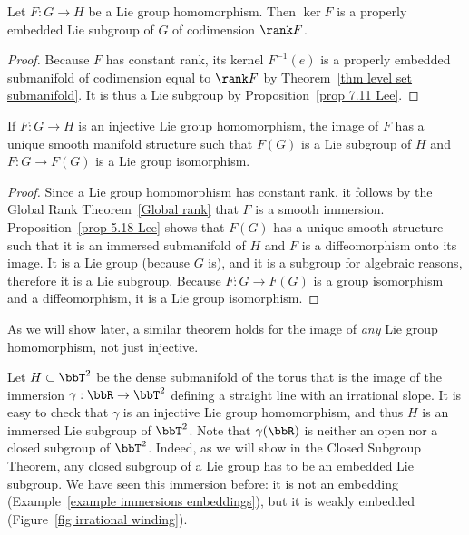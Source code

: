 \begin{prop}
    Let $F:G\to H$ be a Lie group homomorphism. Then $\ker F$ is a properly embedded Lie subgroup of $G$ of codimension $\rank F$.
\end{prop}
\begin{proof}
    Because $F$ has constant rank, its kernel $F^{-1}(e)$ is a properly embedded submanifold of codimension equal to $\rank F$ by Theorem~\ref{thm level set submanifold}. It is thus a Lie subgroup by Proposition~\ref{prop 7.11 Lee}.
\end{proof}

\begin{prop}
    If $F:G\to H$ is an injective Lie group homomorphism, the image of $F$ has a unique smooth manifold structure such that $F(G)$ is a Lie subgroup of $H$ and $F:G\to F(G)$ is a Lie group isomorphism.
\end{prop}
\begin{proof}
    Since a Lie group homomorphism has constant rank, it follows by the Global Rank Theorem~\ref{Global rank} that $F$ is a smooth immersion. Proposition~\ref{prop 5.18 Lee} shows that $F(G)$ has a unique smooth structure such that it is an immersed submanifold of $H$ and $F$ is a diffeomorphism onto its image. It is a Lie group (because $G$ is), and it is a subgroup for algebraic reasons, therefore it is a Lie subgroup. Because $F:G\to F(G)$ is a group isomorphism and a diffeomorphism, it is a Lie group isomorphism.
\end{proof}
\begin{rem}
    As we will show later, a similar theorem holds for the image of \emph{any} Lie group homomorphism, not just injective.
\end{rem}

\begin{example}\label{example dense subgroup of torus}
    Let $H\subset \bbT^2$ be the dense submanifold of the torus that is the image of the immersion $\gamma:\bbR\to\bbT^2$ defining a straight line with an irrational slope. It is easy to check that $\gamma$ is an injective Lie group homomorphism, and thus $H$ is an immersed Lie subgroup of $\bbT^2$. Note that $\gamma(\bbR)$ is neither an open nor a closed subgroup of $\bbT^2$. Indeed, as we will show in the Closed Subgroup Theorem, any closed subgroup of a Lie group has to be an embedded Lie subgroup. We have seen this immersion before: it is not an embedding (Example~\ref{example immersions embeddings}), but it is weakly embedded (Figure~\ref{fig irrational winding}).
\end{example}

